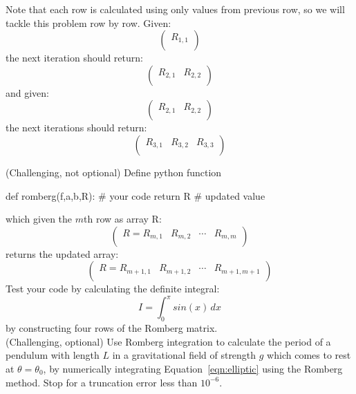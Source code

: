 Note that each row is calculated using only values from previous row, so we will tackle this problem row by row.
Given:
\begin{displaymath}
\begin{pmatrix}
R_{1,1} \\
\end{pmatrix}
\end{displaymath}
the next iteration should return:
\begin{displaymath}
\begin{pmatrix}
R_{2,1} & R_{2,2} \\
\end{pmatrix}
\end{displaymath}
and given:
\begin{displaymath}
\begin{pmatrix}
R_{2,1} & R_{2,2} \\
\end{pmatrix}
\end{displaymath}
the next iterations should return:
\begin{displaymath}
\begin{pmatrix}
R_{3,1} & R_{3,2} & R_{3,3}\\
\end{pmatrix}
\end{displaymath}

\newpage

\plot (Challenging, not optional) Define  python function
\begin{python}
def romberg(f,a,b,R):
   # your code
   return R # updated value
\end{python}
which given the $m$th row as array R:
\begin{displaymath}
\begin{pmatrix}
R = R_{m,1} & R_{m,2} & \cdots & R_{m,m}\\
\end{pmatrix}
\end{displaymath}
returns the updated array:
\begin{displaymath}
\begin{pmatrix}
R = R_{m+1,1} & R_{m+1,2} & \cdots & R_{m+1,m+1}\\
\end{pmatrix}
\end{displaymath}
Test your code by calculating the definite integral:
\begin{displaymath}
I = \int_0^\pi sin(x) \, dx
\end{displaymath}
by constructing four rows of the Romberg matrix.\\

\plot (Challenging, optional) Use Romberg integration to calculate the
period of a pendulum with length $L$ in a gravitational field of
strength $g$ which comes to rest at $\theta = \theta_0$, by
numerically integrating Equation~\ref{eqn:elliptic} using the Romberg
method.  Stop for a truncation error less than $10^{-6}$.
